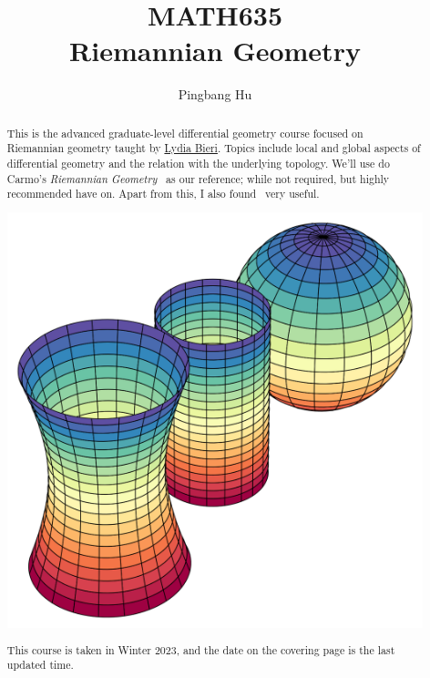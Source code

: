 \documentclass[a4paper]{report}
\author{Pingbang Hu}
\title{MATH635\\Riemannian Geometry}
\begin{document}
\maketitle

\begin{abstract}
	This is the advanced graduate-level differential geometry course focused on Riemannian geometry taught by \href{http://www-personal.umich.edu/~lbieri/}{Lydia Bieri}. Topics include local and global aspects of differential geometry and the relation with the underlying topology. We'll use do Carmo's \emph{Riemannian Geometry}~\cite{flaherty2013riemannian} as our reference; while not required, but highly recommended have on. Apart from this, I also found~\cite{Frederic2015} very useful.

	\vfill
	\begin{center}
		\includegraphics[width=.8\linewidth]{Figures/cover.png}
	\end{center}
	\vfill
	This course is taken in Winter 2023, and the date on the covering page is the last updated time.
\end{abstract}

\tableofcontents


\newpage
\appendix
\appendixpage



\newpage
\printbibliography
\end{document}
